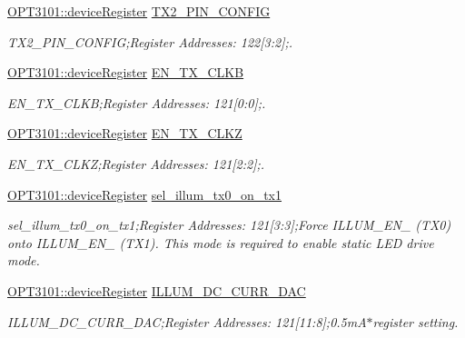 \begin{DoxyCompactItemize}
\mbox{\hyperlink{class_o_p_t3101_1_1device_register}{O\+P\+T3101\+::device\+Register}} \mbox{\hyperlink{class_o_p_t3101_1_1registers_adf50de39484054133ba31e7bfdfe88df}{T\+X2\+\_\+\+P\+I\+N\+\_\+\+C\+O\+N\+F\+IG}}
\begin{DoxyCompactList}\small\item\em T\+X2\+\_\+\+P\+I\+N\+\_\+\+C\+O\+N\+F\+IG;Register Addresses\+: 122\mbox{[}3\+:2\mbox{]};. \end{DoxyCompactList}\item 
\mbox{\hyperlink{class_o_p_t3101_1_1device_register}{O\+P\+T3101\+::device\+Register}} \mbox{\hyperlink{class_o_p_t3101_1_1registers_ae8ad9016ffaf4e1c06c5ea4ae9f51c1f}{E\+N\+\_\+\+T\+X\+\_\+\+C\+L\+KB}}
\begin{DoxyCompactList}\small\item\em E\+N\+\_\+\+T\+X\+\_\+\+C\+L\+KB;Register Addresses\+: 121\mbox{[}0\+:0\mbox{]};. \end{DoxyCompactList}\item 
\mbox{\hyperlink{class_o_p_t3101_1_1device_register}{O\+P\+T3101\+::device\+Register}} \mbox{\hyperlink{class_o_p_t3101_1_1registers_a4e2f7a1b4a9ff27b0f338539597dac8d}{E\+N\+\_\+\+T\+X\+\_\+\+C\+L\+KZ}}
\begin{DoxyCompactList}\small\item\em E\+N\+\_\+\+T\+X\+\_\+\+C\+L\+KZ;Register Addresses\+: 121\mbox{[}2\+:2\mbox{]};. \end{DoxyCompactList}\item 
\mbox{\hyperlink{class_o_p_t3101_1_1device_register}{O\+P\+T3101\+::device\+Register}} \mbox{\hyperlink{class_o_p_t3101_1_1registers_ae39eb9cd24f72ea82c91602018f2cf04}{sel\+\_\+illum\+\_\+tx0\+\_\+on\+\_\+tx1}}
\begin{DoxyCompactList}\small\item\em sel\+\_\+illum\+\_\+tx0\+\_\+on\+\_\+tx1;Register Addresses\+: 121\mbox{[}3\+:3\mbox{]};Force I\+L\+L\+U\+M\+\_\+\+E\+N\+\_ (T\+X0) onto I\+L\+L\+U\+M\+\_\+\+E\+N\+\_ (T\+X1). This mode is required to enable static L\+ED drive mode. \end{DoxyCompactList}\item 
\mbox{\hyperlink{class_o_p_t3101_1_1device_register}{O\+P\+T3101\+::device\+Register}} \mbox{\hyperlink{class_o_p_t3101_1_1registers_abe86782b42774ec90ca0511b44d87f82}{I\+L\+L\+U\+M\+\_\+\+D\+C\+\_\+\+C\+U\+R\+R\+\_\+\+D\+AC}}
\begin{DoxyCompactList}\small\item\em I\+L\+L\+U\+M\+\_\+\+D\+C\+\_\+\+C\+U\+R\+R\+\_\+\+D\+AC;Register Addresses\+: 121\mbox{[}11\+:8\mbox{]};0.\+5mA$\ast$register setting. \end{DoxyCompactList}\item 

\end{DoxyCompactItemize}
